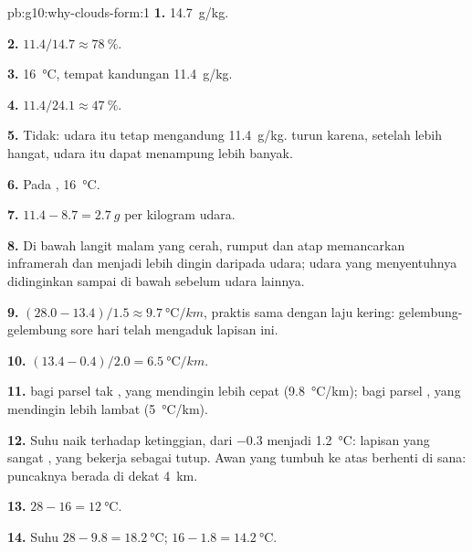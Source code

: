 \begin{solution}{pb:g10:why-clouds-form:1}
\textbf{1.} \qty{14.7}{g/kg}.

\textbf{2.} $11.4/14.7 \approx \qty{78}{\percent}$.

\textbf{3.} \qty{16}{\degreeCelsius}, tempat kandungan 
\qty{11.4}{g/kg}.

\textbf{4.} $11.4/24.1 \approx \qty{47}{\percent}$.

\textbf{5.} Tidak: udara itu tetap mengandung \qty{11.4}{g/kg}.  turun karena, setelah lebih hangat, udara itu dapat menampung lebih
banyak.

\textbf{6.} Pada , \qty{16}{\degreeCelsius}.

\textbf{7.} $11.4 - 8.7 = \qty{2.7}{g}$ per kilogram udara.

\textbf{8.} Di bawah langit malam yang cerah, rumput dan atap memancarkan
inframerah dan menjadi lebih dingin daripada udara; udara yang menyentuhnya
didinginkan sampai di bawah  sebelum udara lainnya.

\textbf{9.} $(28.0 - 13.4)/1.5 \approx \qty{9.7}{\degreeCelsius/km}$,
praktis sama dengan laju kering: gelembung-gelembung sore hari telah mengaduk
lapisan ini.

\textbf{10.} $(13.4 - 0.4)/2.0 = \qty{6.5}{\degreeCelsius/km}$.

\textbf{11.}  bagi parsel tak , yang mendingin lebih cepat
(\qty{9.8}{\degreeCelsius/km});  bagi parsel , yang mendingin
lebih lambat (\qty{5}{\degreeCelsius/km}).

\textbf{12.} Suhu naik terhadap ketinggian, dari \num{-0.3} menjadi
\qty{1.2}{\degreeCelsius}: lapisan yang sangat , yang bekerja sebagai
tutup. Awan yang tumbuh ke atas berhenti di sana: puncaknya berada di dekat
\qty{4}{km}.

\textbf{13.} $28 - 16 = \qty{12}{\degreeCelsius}$.

\textbf{14.} Suhu $28 - 9.8 = \qty{18.2}{\degreeCelsius}$; 
$16 - 1.8 = \qty{14.2}{\degreeCelsius}$.


\end{solution}
